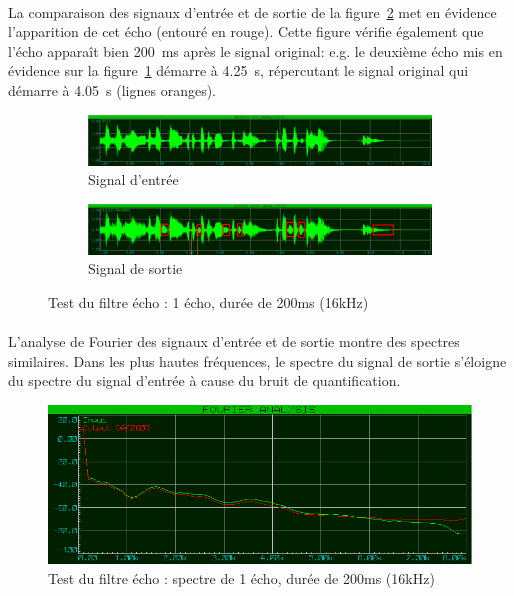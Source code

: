 \documentclass{article}
\begin{document}
    \paragraph{}
    La comparaison des signaux d'entrée et de sortie de la figure~\ref{fig:echo_16k} met en évidence l'apparition de cet écho (entouré en rouge). Cette figure vérifie également que l'écho apparaît bien \SI{200}{\milli\second} après le signal original: e.g. le deuxième écho mis en évidence sur la figure~\ref{fig:echo_16k_out} démarre à \SI{4.25}{\second}, répercutant le signal original qui démarre à \SI{4.05}{\second} (lignes oranges).

    \begin{figure}[H]
        \centering
        \begin{subfigure}[b]{\textwidth}
            \centering
            \includegraphics[width=\textwidth]{./images/in_angelou_16k.png}
            \caption{Signal d'entrée}
        \end{subfigure}
        \begin{subfigure}[b]{\textwidth}
            \centering
            \includegraphics[width=\textwidth]{./images/out_echo_1_200ms_16k.png}
            \caption{Signal de sortie}
            \label{fig:echo_16k_out}
        \end{subfigure}
        \caption{Test du filtre écho : 1 écho, durée de 200ms (16kHz)}
        \label{fig:echo_16k}
    \end{figure}

    \paragraph{}
    L'analyse de Fourier des signaux d'entrée et de sortie montre des spectres similaires. Dans les plus hautes fréquences, le spectre du signal de sortie s'éloigne du spectre du signal d'entrée à cause du bruit de quantification.

    \begin{figure}[H]
        \centering
        \includegraphics[width=.6\textwidth]{./images/spectrum_echo_1_200ms_16k.png}
        \caption{Test du filtre écho : spectre de 1 écho, durée de 200ms (16kHz)}
    \end{figure}
\end{document}
